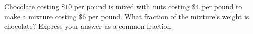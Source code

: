Chocolate costing $\$10$ per pound is mixed with nuts costing $\$4$ per pound to make a mixture costing $\$6$ per pound. What fraction of the mixture's weight is chocolate? Express your answer as a common fraction.
